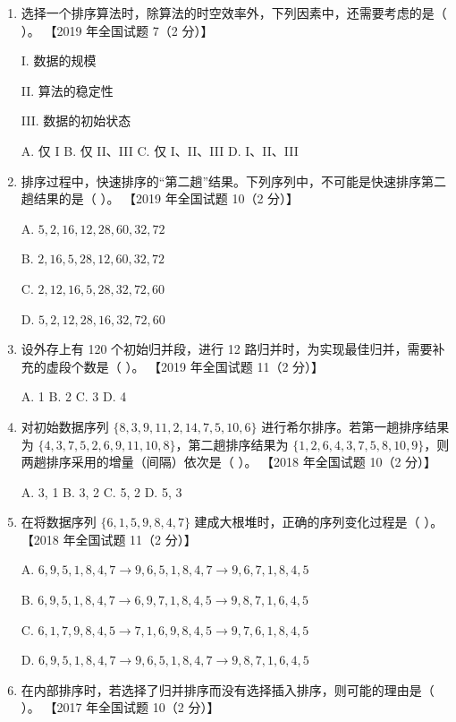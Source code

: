 \documentclass[lang=cn,newtx,10pt,scheme=chinese]{elegantbook}
\begin{document}
\begin{enumerate}
    \item 选择一个排序算法时，除算法的时空效率外，下列因素中，还需要考虑的是（ ）。  
    【2019 年全国试题 7（2 分）】  

    I. 数据的规模  

    II. 算法的稳定性  

    III. 数据的初始状态  

    A. 仅 I \quad B. 仅 II、III \quad C. 仅 I、II、III \quad D. I、II、III  

    \item 排序过程中，快速排序的“第二趟”结果。下列序列中，不可能是快速排序第二趟结果的是（ ）。  
    【2019 年全国试题 10（2 分）】  

    A. $5, 2, 16, 12, 28, 60, 32, 72$  

    B. $2, 16, 5, 28, 12, 60, 32, 72$ 

    C. $2, 12, 16, 5, 28, 32, 72, 60$  

    D. $5, 2, 12, 28, 16, 32, 72, 60$  

    \item 设外存上有 120 个初始归并段，进行 12 路归并时，为实现最佳归并，需要补充的虚段个数是（ ）。  
    【2019 年全国试题 11（2 分）】 

    A. 1 \quad B. 2 \quad C. 3 \quad D. 4  

    \item 对初始数据序列 $\{8, 3, 9, 11, 2, 14, 7, 5, 10, 6\}$ 进行希尔排序。若第一趟排序结果为 $\{4, 3, 7, 5, 2, 6, 9, 11, 10, 8\}$，第二趟排序结果为 $\{1, 2, 6, 4, 3, 7, 5, 8, 10, 9\}$，则两趟排序采用的增量（间隔）依次是（ ）。  
    【2018 年全国试题 10（2 分）】 

    A. 3, 1 \quad B. 3, 2 \quad C. 5, 2 \quad D. 5, 3  

    \item 在将数据序列 $\{6, 1, 5, 9, 8, 4, 7\}$ 建成大根堆时，正确的序列变化过程是（ ）。  
    【2018 年全国试题 11（2 分）】

    A. $6, 9, 5, 1, 8, 4, 7 \to 9, 6, 5, 1, 8, 4, 7 \to 9, 6, 7, 1, 8, 4, 5$  

    B. $6, 9, 5, 1, 8, 4, 7 \to 6, 9, 7, 1, 8, 4, 5 \to 9, 8, 7, 1, 6, 4, 5$  

    C. $6, 1, 7, 9, 8, 4, 5 \to 7, 1, 6, 9, 8, 4, 5 \to 9, 7, 6, 1, 8, 4, 5$  

    D. $6, 9, 5, 1, 8, 4, 7 \to 9, 6, 5, 1, 8, 4, 7 \to 9, 8, 7, 1, 6, 4, 5$  

    \item 在内部排序时，若选择了归并排序而没有选择插入排序，则可能的理由是（ ）。  
    【2017 年全国试题 10（2 分）】  


\end{enumerate}
\end{document}
